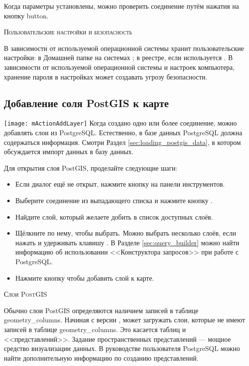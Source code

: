 Когда параметры установлены, можно проверить соединение путём нажатия
на кнопку  button.

\begin{Tip}\caption{\textsc{\qg Пользовательские настройки и безопасность}}
В зависимости от используемой операционной системы \qg хранит
пользовательские настройки: в Домашней папке на \nix системах
; в реестре, если используется \win. В зависимости
от используемой операционной системы и настроек компьютера, хранение пароля в настройках \qg может
создавать угрозу безопасности.
\end{Tip}

\subsection{Добавление соля PostGIS к карте}

\texttt{[image: mActionAddLayer]} Когда создано одно или более соединение,
можно добавлять слои из PostgreSQL.
Естественно, в базе данных PostgreSQL должна содержаться информация. Смотри Раздел
\ref{sec:loading_postgis_data}, в котором обсуждается импорт данных
в базу данных.

Для открытия слоя PostGIS, проделайте следующие шаги:

\begin{itemize}[label=--]
\item Если диалог  ещё не открыт, нажмите
кнопку  на панели инструментов.
\item Выберите соединение из выпадающего списка и нажмите кнопку .
\item Найдите слой, который желаете добить в список доступных слоёв.
\item Щёлкните по нему, чтобы выбрать. Можно выбрать несколько слоёв, если нажать и удерживать
клавишу . В Разделе \ref{sec:query_builder} можно найти информацию
об использовании <<Конструктора запросов>> при работе с PostgreSQL.
\item Нажмите кнопку  чтобы добавить слой к карте.
\end{itemize}

\begin{Tip}\caption{\textsc{Слои PostGIS}}
Обычно слои PostGIS определяются наличием записей в таблице
geometry\_columns. Начиная с версии \OLD %
, \qg может загружать слои, которые не имеют
записей в таблице geometry\_columns. Это касается таблиц и <<представлений>>.
Задание пространственных представлений --- мощное средство визуализации данных. В
руководстве пользователя PostgreSQL можно найти дополнительную информацию по созданию представлений.
\end{Tip}

